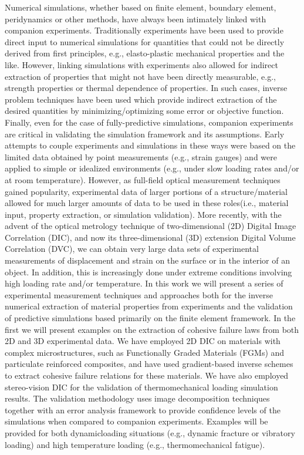 Numerical simulations, whether based on finite element, boundary element, peridynamics or other methods, have always been intimately linked with companion experiments. Traditionally experiments have been used to provide direct input to numerical simulations for quantities that could not be directly derived from first principles, e.g., elasto-plastic mechanical properties and the like. However, linking simulations with experiments also allowed for indirect extraction of properties that might not have been directly measurable, e.g., strength properties or thermal dependence of properties. In such cases, inverse problem techniques have been used which provide indirect extraction of the desired quantities by minimizing/optimizing some error or objective function. Finally, even for the case of fully-predictive simulations, companion experiments are critical in validating the simulation framework and its assumptions. Early attempts to couple experiments and simulations in these ways were based on the limited data obtained by point measurements (e.g., strain gauges) and were applied to simple or idealized environments (e.g., under slow loading rates and/or at room temperature). However, as full-field optical measurement techniques gained popularity, experimental data of larger portions of a structure/material allowed for much larger amounts of data to be used in these roles(i.e., material input, property extraction, or simulation validation). More recently, with the advent of the optical metrology technique of two-dimensional (2D) Digital Image Correlation (DIC), and now its three-dimensional (3D) extension Digital Volume Correlation (DVC), we can obtain very large data sets of experimental measurements of displacement and strain on the surface or in the interior of an object. In addition, this is increasingly done under extreme conditions involving high loading rate and/or temperature. In this work we will present a series of experimental measurement techniques and approaches both for the inverse numerical extraction of material properties from experiments and the validation of predictive simulations based primarily on the finite element framework. In the first we will present examples on the extraction of cohesive failure laws from both 2D and 3D experimental data. We have employed 2D DIC on materials with complex microstructures, such as Functionally Graded Materials (FGMs) and particulate reinforced composites, and have used gradient-based inverse schemes to extract cohesive failure relations for these materials. We have also employed stereo-vision DIC for the validation of thermomechanical loading simulation results. The validation methodology uses image decomposition techniques together with an error analysis framework to provide confidence levels of the simulations when compared to companion experiments. Examples will be provided for both dynamicloading situations (e.g., dynamic fracture or vibratory loading) and high temperature loading (e.g., thermomechanical fatigue).
